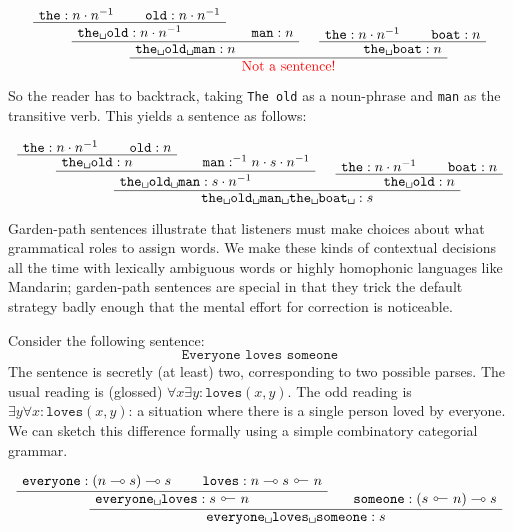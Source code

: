 \begin{fullwidth}
\begin{example}
\[
\AxiomC{$\texttt{the} : n \cdot n^{-1}$}
\AxiomC{$\texttt{old} : n \cdot n^{-1}$}
\BinaryInfC{$\texttt{the\textvisiblespace old}: n \cdot n^{-1}$}
\AxiomC{$\texttt{man} : n$}
\BinaryInfC{$\texttt{the\textvisiblespace old\textvisiblespace man}: n$}
\AxiomC{$\texttt{the} : n \cdot n^{-1}$}
\AxiomC{$\texttt{boat} : n$}
\BinaryInfC{$\texttt{the\textvisiblespace boat}: n$}
\BinaryInfC{\textcolor{red}{Not a sentence!}}
\DisplayProof
\]

So the reader has to backtrack, taking \texttt{The old} as a noun-phrase and \texttt{man} as the transitive verb. This yields a sentence as follows:

\[
\AxiomC{$\texttt{the} : n \cdot n^{-1}$}
\AxiomC{$\texttt{old} : n$}
\BinaryInfC{$\texttt{the\textvisiblespace old}: n$}
\AxiomC{$\texttt{man} : ^{-1}n \cdot s \cdot n^{-1}$}
\BinaryInfC{$\texttt{the\textvisiblespace old\textvisiblespace man}: s \cdot n^{-1}$}
\AxiomC{$\texttt{the} : n \cdot n^{-1}$}
\AxiomC{$\texttt{boat} : n$}
\BinaryInfC{$\texttt{the\textvisiblespace old}: n$}
\BinaryInfC{$\texttt{the\textvisiblespace old\textvisiblespace man\textvisiblespace the\textvisiblespace boat\textvisiblespace}: s$}
\DisplayProof
\]

Garden-path sentences illustrate that listeners must make choices about what grammatical roles to assign words. We make these kinds of contextual decisions all the time with lexically ambiguous words or highly homophonic languages like Mandarin; garden-path sentences are special in that they trick the default strategy badly enough that the mental effort for correction is noticeable.
\end{example}

\begin{example}
Consider the following sentence:
\[\texttt{Everyone loves someone}\]
The sentence is secretly (at least) two, corresponding to two possible parses. The usual reading is (glossed) $\forall x \exists y : \texttt{loves}(x,y)$. The odd reading is $\exists y \forall x : \texttt{loves}(x,y)$: a situation where there is a single person loved by everyone. We can sketch this difference formally using a simple combinatory categorial grammar.

\[
\AxiomC{$\texttt{everyone} : (n \multimap s) \multimap s$}
\AxiomC{$\texttt{loves} : n \multimap s \ \rotatebox[origin=c]{180}{$\multimap$} \ n$}
\BinaryInfC{$\texttt{everyone\textvisiblespace loves} : s \ \rotatebox[origin=c]{180}{$\multimap$} \ n$}
\AxiomC{$\texttt{someone} : (s \ \rotatebox[origin=c]{180}{$\multimap$} \ n) \multimap s$}
\BinaryInfC{$\texttt{everyone\textvisiblespace loves\textvisiblespace someone} : s$}
\DisplayProof
\]


\end{example}
\end{fullwidth}
